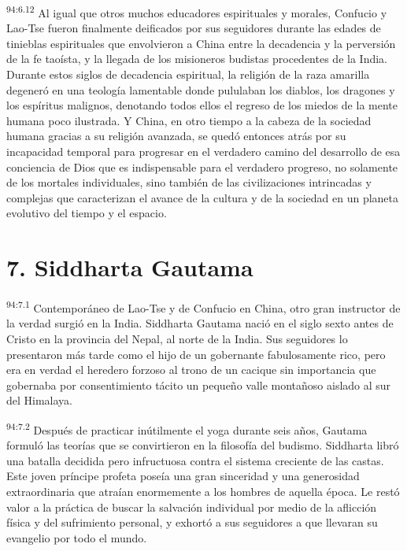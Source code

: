 \par
\textsuperscript{94:6.12} Al igual que otros muchos educadores espirituales y morales, Confucio y Lao-Tse fueron finalmente deificados por sus seguidores durante las edades de tinieblas espirituales que envolvieron a China entre la decadencia y la perversión de la fe taoísta, y la llegada de los misioneros budistas procedentes de la India. Durante estos siglos de decadencia espiritual, la religión de la raza amarilla degeneró en una teología lamentable donde pululaban los diablos, los dragones y los espíritus malignos, denotando todos ellos el regreso de los miedos de la mente humana poco ilustrada. Y China, en otro tiempo a la cabeza de la sociedad humana gracias a su religión avanzada, se quedó entonces atrás por su incapacidad temporal para progresar en el verdadero camino del desarrollo de esa conciencia de Dios que es indispensable para el verdadero progreso, no solamente de los mortales individuales, sino también de las civilizaciones intrincadas y complejas que caracterizan el avance de la cultura y de la sociedad en un planeta evolutivo del tiempo y el espacio.

\section*{7. Siddharta Gautama}
\par
\textsuperscript{94:7.1} Contemporáneo de Lao-Tse y de Confucio en China, otro gran instructor de la verdad surgió en la India. Siddharta Gautama nació en el siglo sexto antes de Cristo en la provincia del Nepal, al norte de la India. Sus seguidores lo presentaron más tarde como el hijo de un gobernante fabulosamente rico, pero era en verdad el heredero forzoso al trono de un cacique sin importancia que gobernaba por consentimiento tácito un pequeño valle montañoso aislado al sur del Himalaya.

\par
\textsuperscript{94:7.2} Después de practicar inútilmente el yoga durante seis años, Gautama formuló las teorías que se convirtieron en la filosofía del budismo. Siddharta libró una batalla decidida pero infructuosa contra el sistema creciente de las castas. Este joven príncipe profeta poseía una gran sinceridad y una generosidad extraordinaria que atraían enormemente a los hombres de aquella época. Le restó valor a la práctica de buscar la salvación individual por medio de la aflicción física y del sufrimiento personal, y exhortó a sus seguidores a que llevaran su evangelio por todo el mundo.

